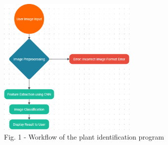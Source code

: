 \begin{figure}[H]
	\centering
	\includegraphics[width=0.6\textwidth]{media/ict/image31}
	\caption*{Fig. 1 - Workflow of the plant identification program}
\end{figure}

